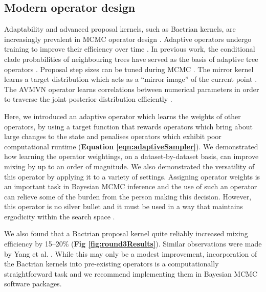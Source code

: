 \documentclass[10pt,letterpaper]{article}
\begin{document}

\subsection*{Modern operator design}


Adaptability and advanced proposal kernels, such as Bactrian kernels, are increasingly prevalent in MCMC operator design \cite{haario2001adaptive,vihola2012robust,benson2018adaptive,davis2020blocking}.
Adaptive operators undergo training to improve their efficiency over time \cite{roberts2007coupling}. 
In previous work, the conditional clade probabilities of neighbouring trees have served as the basis of adaptive tree operators \cite{hohna2012guided,meyer2019adaptive}.
Proposal step sizes can be tuned during MCMC \cite{rosenthal2011optimal}.
The mirror kernel learns a target distribution which acts as a ``mirror image'' of the current point \cite{thawornwattana2018designing}.
The AVMVN operator learns correlations between numerical parameters in order to traverse the joint posterior distribution efficiently \cite{baele2017adaptive}.



Here, we introduced an adaptive operator which learns the weights of other operators, by using a target function that rewards operators which bring about large changes to the state and penalises operators which exhibit poor computational runtime (\textbf{Equation \ref{eqn:adaptiveSampler}}).
We demonstrated how learning the operator weightings, on a dataset-by-dataset basis, can improve mixing by up to an order of magnitude.
We also demonstrated the versatility of this operator by applying it to a variety of settings.
Assigning operator weights is an important task in Bayesian MCMC inference and the use of such an operator can relieve some of the burden from the person making this decision.
However, this operator is no silver bullet and it must be used in a way that maintains ergodicity within the search space \cite{roberts2007coupling}.


We also found that a Bactrian proposal kernel quite reliably increased mixing efficiency by 15--20\% (\textbf{Fig \ref{fig:round3Results}}).
Similar observations were made by Yang et al. \cite{yang2013searching}.
While this may only be a modest improvement, incorporation of the Bactrian kernels into pre-existing operators is a computationally straightforward task and we recommend implementing them in Bayesian MCMC software packages.

	
	
\end{document}
